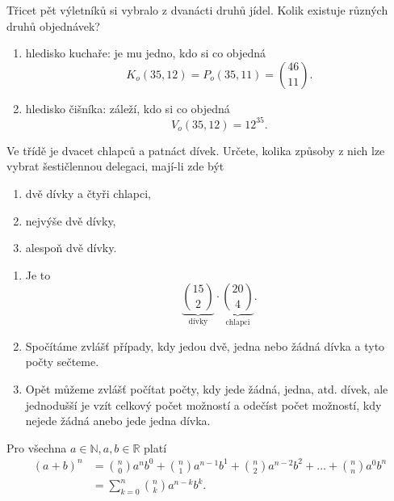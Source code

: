 \begin{priklad}
Třicet pět výletníků si vybralo z dvanácti druhů jídel. Kolik existuje
různých druhů objednávek?
\end{priklad}

\begin{reseni}
\begin{enumerate}[$i.$]
\item hledisko kuchaře: je mu jedno, kdo si co objedná
$$K_o(35,12)=P_o(35,11)=\binom{46}{11}.$$
\item hledisko čišníka: záleží, kdo si co objedná
$$V_o(35,12)=12^{35}.$$
\end{enumerate}
\end{reseni}

\begin{priklad}
Ve třídě je dvacet chlapců a patnáct dívek. Určete, kolika způsoby z nich lze vybrat
šestičlennou delegaci, mají-li zde být
\begin{enumerate}[$a.$]
\item dvě dívky a čtyři chlapci,
\item nejvýše dvě dívky,
\item alespoň dvě dívky.
\end{enumerate}
\end{priklad}

\begin{reseni}
\begin{enumerate}[$a.$]
\item Je to
$$\underbrace{\binom{15}{2}}_{\textrm{dívky}} \cdot \underbrace{\binom{20}{4}}_{\textrm{chlapci}}.$$
\item Spočítáme zvlášť případy, kdy jedou dvě, jedna nebo žádná dívka a tyto počty sečteme.
\item Opět můžeme zvlášť počítat počty, kdy jede žádná, jedna, atd. dívek, ale jednodušší
je vzít celkový počet možností a odečíst počet možností, kdy nejede žádná anebo jede
jedna dívka.
\end{enumerate}
\end{reseni}

\begin{veta}
    Pro všechna $a \in \mathbb N, a,b \in \mathbb R$ platí
    \begin{align*}
        (a+b)^n & = \binom{n}{0}a^nb^0 + \binom{n}{1}a^{n-1}b^1 + \binom{n}{2}
        a^{n-2}b^2 + \dots + \binom{n}{n}a^0b^n \\
        &= \sum_{k=0}^n \binom{n}{k}a^{n-k}b^k.
    \end{align*}
\end{veta}

